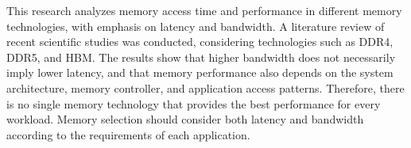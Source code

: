 This research analyzes memory access time and performance in different memory
technologies, with emphasis on latency and bandwidth. A literature review of
recent scientific studies was conducted, considering technologies such as
DDR4, DDR5, and HBM. The results show that higher bandwidth does not
necessarily imply lower latency, and that memory performance also depends on
the system architecture, memory controller, and application access patterns.
Therefore, there is no single memory technology that provides the best
performance for every workload. Memory selection should consider both latency
and bandwidth according to the requirements of each application.